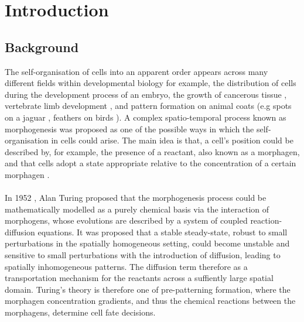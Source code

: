 \chapter{Introduction}

\section{Background}

The self-organisation of cells into an apparent order appears across many different fields within developmental biology for example, the distribution of cells during the development process of an embryo, the growth of cancerous tissue \cite{morph}, vertebrate limb development \cite{miura1,glimm,miura2}, and pattern formation on animal coats (e.g spots on a jaguar \cite{painter}, feathers on birds \cite{bailleul}). A complex spatio-temporal process known as morphogenesis was proposed as one of the possible ways in which the self-organisation in cells could arise. The main idea is that, a cell's position could be described by, for example, the presence of a reactant, also known as a morphagen, and that cells adopt a state appropriate relative to the concentration of a certain morphagen \cite{beentjes}.
\\\\
In 1952 \cite{turing}, Alan Turing proposed that the morphogenesis process could be mathematically modelled as a purely chemical basis via the interaction of morphogens, whose evolutions are described by a system of coupled reaction-diffusion equations. It was proposed that a stable steady-state, robust to small perturbations in the spatially homogeneous setting, could become unstable and sensitive to small perturbations with the introduction of diffusion, leading to spatially inhomogeneous patterns. The diffusion term therefore as a transportation mechanism for the reactants across a suffiently large spatial domain. Turing's theory is therefore one of pre-patterning formation, where the morphagen concentration gradients, and thus the chemical reactions between the morphagens, determine cell fate decisions.
\\\\
